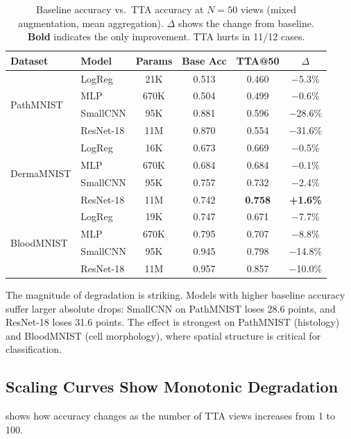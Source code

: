 \documentclass{article}
\theoremstyle{plain}
\theoremstyle{definition}
\theoremstyle{remark}
\begin{document}
\begin{table}[h!]
\centering
\caption{Baseline accuracy vs.\ TTA accuracy at $N=50$ views (mixed augmentation, mean aggregation). $\Delta$ shows the change from baseline. \textbf{Bold} indicates the only improvement. TTA hurts in 11/12 cases.}
\label{tab:main}
\begin{tabular}{@{}llcccc@{}}
\toprule
Dataset & Model & Params & Base Acc & TTA@50 & $\Delta$ \\
\midrule
\multirow{4}{*}{PathMNIST}
& LogReg     & 21K  & 0.513 & 0.460 & $-$5.3\% \\
& MLP        & 670K & 0.504 & 0.499 & $-$0.6\% \\
& SmallCNN   & 95K  & 0.881 & 0.596 & $-$28.6\% \\
& ResNet-18  & 11M  & 0.870 & 0.554 & $-$31.6\% \\
\midrule
\multirow{4}{*}{DermaMNIST}
& LogReg     & 16K  & 0.673 & 0.669 & $-$0.5\% \\
& MLP        & 670K & 0.684 & 0.684 & $-$0.1\% \\
& SmallCNN   & 95K  & 0.757 & 0.732 & $-$2.4\% \\
& ResNet-18  & 11M  & 0.742 & \textbf{0.758} & \textbf{+1.6\%} \\
\midrule
\multirow{4}{*}{BloodMNIST}
& LogReg     & 19K  & 0.747 & 0.671 & $-$7.7\% \\
& MLP        & 670K & 0.795 & 0.707 & $-$8.8\% \\
& SmallCNN   & 95K  & 0.945 & 0.798 & $-$14.8\% \\
& ResNet-18  & 11M  & 0.957 & 0.857 & $-$10.0\% \\
\bottomrule
\end{tabular}
\end{table}

The magnitude of degradation is striking. Models with higher baseline accuracy suffer larger absolute drops: SmallCNN on PathMNIST loses 28.6 points, and ResNet-18 loses 31.6 points. The effect is strongest on PathMNIST (histology) and BloodMNIST (cell morphology), where spatial structure is critical for classification.

\subsection{Scaling Curves Show Monotonic Degradation}

 shows how accuracy changes as the number of TTA views increases from 1 to 100.
\end{document}

